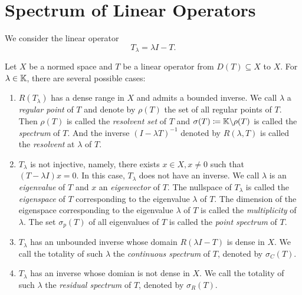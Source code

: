 \section{Spectrum of Linear Operators}
We consider the linear operator 
\begin{equation*}
    T_\lambda = \lambda I - T. 
\end{equation*}
\begin{defn}
Let $X$ be a normed space and $T$ be a linear operator from $D(T) \subseteq X$ 
to $X$. 
For $\lambda \in \mathbb{K}$, there are several possible cases: 
\begin{enumerate}
    \item 
    $R(T_\lambda)$ has a dense range in $X$ and admits a bounded inverse. 
    We call $\lambda$ a \emph{regular point} of $T$ and denote by $\rho(T)$ 
    the set of all regular points of $T$. 
    Then $\rho(T)$ is called the \emph{resolvent set} of $T$ and $\sigma(T) 
    \coloneqq \mathbb{K} \backslash \rho(T)$ is called the \emph{spectrum} of $T$. 
    And the inverse $(I - \lambda T)^{-1}$ denoted by $R(\lambda, T)$ is 
    called the \emph{resolvent} at $\lambda$ of $T$. 

    \item $T_\lambda$ is not injective, namely, there exists $x \in X, 
    x \neq 0$ such that $(T - \lambda I)x = 0$. 
    In this case, $T_\lambda$ does not have an inverse. 
    We call $\lambda$ is an \emph{eigenvalue} of $T$ and $x$ an 
    \emph{eigenvector} of $T$. 
    The nullspace of $T_\lambda$ is called the \emph{eigenspace} of $T$ 
    corresponding to the eigenvalue $\lambda$ of $T$. 
    The dimension of the eigenspace corresponding to the eigenvalue 
    $\lambda$ of $T$ is called the \emph{multiplicity} of $\lambda$. 
    The set $\sigma_p(T)$ of all eigenvalues of $T$ is called the 
    \emph{point spectrum} of $T$. 

    \item $T_\lambda$ has an unbounded inverse whose domain 
    $R(\lambda I - T)$ is dense in $X$.
    We call the totality of such $\lambda$ the \emph{continuous spectrum} 
    of $T$, denoted by $\sigma_C(T)$. 

    \item $T_\lambda$ has an inverse whose domian is not dense in $X$. 
    We call the totality of such $\lambda$ the \emph{residual spectrum} of 
    $T$, denoted by $\sigma_R(T)$.
    
\end{enumerate}
\end{defn}

